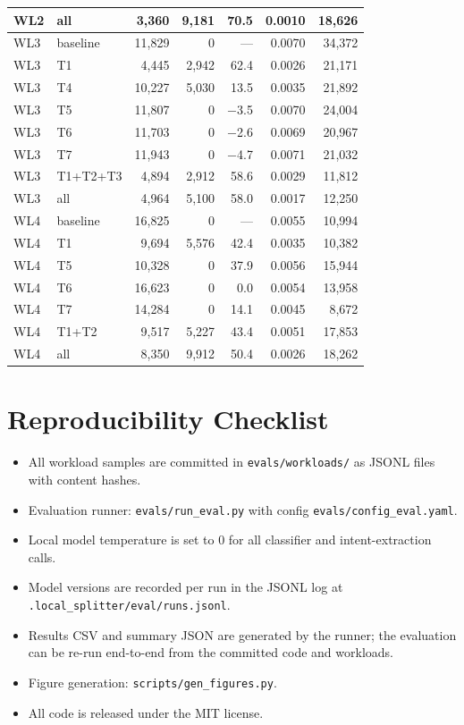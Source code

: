 \documentclass[11pt,a4paper]{article}
\begin{document}
\begin{table}[h]
\begin{tabular}{l l r r r r r}
WL2 & all       &  3{,}360 & 9{,}181 & 70.5 & 0.0010 & 18{,}626 \\
\midrule
WL3 & baseline  & 11{,}829 &     0 &   --- & 0.0070 & 34{,}372 \\
WL3 & T1        &  4{,}445 & 2{,}942 & 62.4 & 0.0026 & 21{,}171 \\
WL3 & T4        & 10{,}227 & 5{,}030 & 13.5 & 0.0035 & 21{,}892 \\
WL3 & T5        & 11{,}807 &     0 & $-$3.5 & 0.0070 & 24{,}004 \\
WL3 & T6        & 11{,}703 &     0 & $-$2.6 & 0.0069 & 20{,}967 \\
WL3 & T7        & 11{,}943 &     0 & $-$4.7 & 0.0071 & 21{,}032 \\
WL3 & T1+T2+T3  &  4{,}894 & 2{,}912 & 58.6 & 0.0029 & 11{,}812 \\
WL3 & all       &  4{,}964 & 5{,}100 & 58.0 & 0.0017 & 12{,}250 \\
\midrule
WL4 & baseline  & 16{,}825 &     0 &   --- & 0.0055 & 10{,}994 \\
WL4 & T1        &  9{,}694 & 5{,}576 & 42.4 & 0.0035 & 10{,}382 \\
WL4 & T5        & 10{,}328 &     0 & 37.9 & 0.0056 & 15{,}944 \\
WL4 & T6        & 16{,}623 &     0 &  0.0 & 0.0054 & 13{,}958 \\
WL4 & T7        & 14{,}284 &     0 & 14.1 & 0.0045 &  8{,}672 \\
WL4 & T1+T2     &  9{,}517 & 5{,}227 & 43.4 & 0.0051 & 17{,}853 \\
WL4 & all       &  8{,}350 & 9{,}912 & 50.4 & 0.0026 & 18{,}262 \\
\bottomrule
\end{tabular}
\end{table}

\section{Reproducibility Checklist}
\label{app:repro}

\begin{itemize}
  \item All workload samples are committed in \texttt{evals/workloads/}
    as JSONL files with content hashes.
  \item Evaluation runner: \texttt{evals/run\_eval.py} with config
    \texttt{evals/config\_eval.yaml}.
  \item Local model temperature is set to 0 for all classifier and
    intent-extraction calls.
  \item Model versions are recorded per run in the JSONL log at
    \texttt{.local\_splitter/eval/runs.jsonl}.
  \item Results CSV and summary JSON are generated by the runner;
    the evaluation can be re-run end-to-end from the committed code
    and workloads.
  \item Figure generation: \texttt{scripts/gen\_figures.py}.
  \item All code is released under the MIT license.
\end{itemize}
\end{document}
